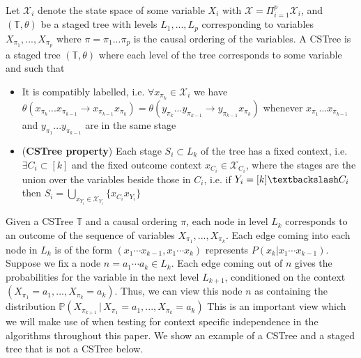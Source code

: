 \documentclass{tufte-book}
\begin{document}
\begin{definition}[CSTrees]\label{def:cstree}
Let $\mathcal{X}_i$ denote the state space of some variable $X_i$ with $\mathcal{X} = \Pi_{i=1}^p \mathcal{X}_i$, and $(\mathbb{T},\theta)$ be a staged tree with levels $L_1,...,L_p$ corresponding to variables $X_{\pi_1},...,X_{\pi_p}$ where $\pi = \pi_1...\pi_p$ is the causal ordering of the variables.  
A CSTree is a staged tree $(\mathbb{T}, \theta)$ where each level of the tree corresponds to some variable and  such that 
\begin{itemize}
\item It is compatibly labelled, i.e. $\forall x_{\pi_k} \in \mathcal{X}_i$ we have $\theta(x_{\pi_k}...x_{\pi_{k-1}}\rightarrow x_{\pi_{k-1}}x_{\pi_k}) = \theta(y_{\pi_k}...y_{\pi_{k-1}}\rightarrow y_{\pi_{k-1}}x_{\pi_k})$ whenever $x_{\pi_1}...x_{\pi_{k-1}}$ and $y_{\pi_1}...y_{\pi_{k-1}}$ are in the same stage
\item (\textbf{CSTree property}) Each stage $S_i \subset L_k$ of the tree has a fixed context, i.e. $\exists C_i \subset [k]$ and the fixed outcome context $x_{C_i} \in \mathcal{X}_{C_i}$, where the stages are the union over the variables beside those in $C_i$, i.e. if $Y_i = [k] \textbackslash C_i$ then $S_i = \bigcup_{x_{Y_i} \in \mathcal{X}_{Y_i}} \{x_{C_i}x_{Y_i} \}$  
\end{itemize}
\end{definition}



Given a CSTree \(\mathbb{T}\) and a causal ordering \(\pi\), each node in level \(L_k\) corresponds to an outcome of the sequence of variables \(X_{\pi_1},...,X_{\pi_k}\). Each edge coming into each node in \(L_k\) is of the form \((x_1\cdots x_{k-1},x_1\cdots x_k)\) represents \(P(x_{k}|x_1 \cdots x_{k-1})\). Suppose we fix a node \(n = a_1\cdots a_k \in L_k\). Each edge coming out of \(n\) gives the probabilities for the variable in the next level \(L_{k+1}\), conditioned on the context \((X_{\pi_1}=a_1,...,X_{\pi_k}=a_k)\). Thus, we can view this node \(n\) as containing the distribution \(\mathbb{P}(X_{\pi_{k+1}}\,|\, X_{\pi_1}=a_1,...,X_{\pi_k}=a_k)\) This is an important view which we will make use of when testing for context specific independence in the algorithms throughout this paper. We show an example of a CSTree and a staged tree that is not a CSTree below.

 \newpage 
\end{document}
